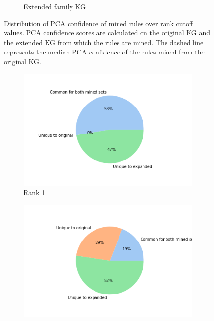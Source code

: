 \begin{figure}[!htb]
\begin{subfigure}{.5\textwidth}
  \caption{Extended family KG}
  \label{fig:_PCA_rank_family_boxplot_sub}
\end{subfigure}
\caption[Dist. of PCA conf. of rules over rank cutoff values]{Distribution of PCA confidence of mined rules over rank cutoff values. PCA confidence scores are calculated on the original KG and the extended KG from which the rules are mined. The dashed line represents the median PCA confidence of the rules mined from the original KG.}
\label{fig:PCA_rank_boxplot}
\end{figure}







\begin{figure}[!htbp]
        \centering
        \begin{subfigure}[b]{0.3\textwidth}
            \centering
            \includegraphics[width=\textwidth]{figures/results/ranks/pie_charts/('rank_cutoff', 1)_wn18rr.png}
            \caption[]%
            {{\small Rank 1}}    
            \label{fig:rank_1_pie_wn18rr}
        \end{subfigure}
        \begin{subfigure}[b]{0.3\textwidth}  
            \centering 
            \includegraphics[width=\textwidth]{figures/results/ranks/pie_charts/('rank_cutoff', 4)_wn18rr.png}

\end{subfigure}
\end{figure}
